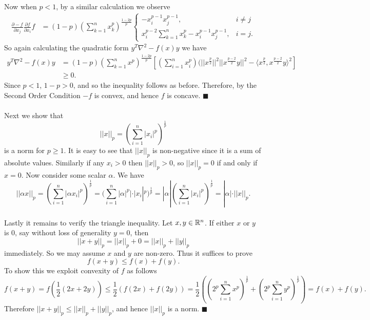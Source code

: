 \documentclass[letterpaper,12pt,oneside,onecolumn]{article}
\begin{document}
\paragraph{}
Now when $p < 1$, by a similar calculation we observe
\begin{align*}
\frac{\partial -f}{\partial x_j}\frac{\partial f}{\partial x_i} f &=(1-p)(\sum_{k=1}^n x_k^p)^\frac{1-2p}{p}\begin{cases}
-x_i^{p-1}x_j^{p-1}, &i\neq j \\
x_i^{p-2}\sum_{k=1}^n x_k^p  -x_i^{p-1}x_j^{p-1}, &i=j.
\end{cases}
\end{align*}
So again calculating the quadratic form $y^T\nabla^2-f(x)y$ we have
\begin{align*}
y^T\nabla^2-f(x)y &=(1-p) (\sum_{k=1}^nx^p)^\frac{1-2p}{p}[(\sum_{i=1}^nx_i^{p})(||x^\frac{p}{2}||^2||x^\frac{p-2}{2}y||^2 - \langle x^\frac{p}{2}, x^\frac{p-2}{2}y\rangle^2]\\
&\geq 0.
\end{align*}
Since $p < 1$, $1-p >0$, and so the inequality follows as before. Therefore, by the Second Order Condition $-f$ is convex, and hence $f$ is concave. $\blacksquare$
\paragraph{}
Next we show that
$$||x||_p = (\sum_{i=1}^n |x_i|^p)^\frac{1}{p}$$
is a norm for $p\geq 1$. It is easy to see that $||x||_p$ is non-negative since it is a sum of absolute values. Similarly if any $x_i > 0$ then $||x||_p > 0$, so $||x||_p = 0$ if and only if $x = 0$. Now consider some scalar $\alpha$. We have
$$||\alpha x||_p = (\sum_{i=1}^n |\alpha x_i|^p)^\frac{1}{p} = (\sum_{i=1}^n |\alpha|^p|\cdot |x_i|^p)^\frac{1}{p} = |\alpha|(\sum_{i=1}^n |x_i|^p)^\frac{1}{p} = |\alpha|\cdot ||x||_p.$$
\paragraph{}
Lastly it remains to verify the triangle inequality. Let $x, y \in \mathbb{R}^n$. If either $x$ or $y$ is $0$, say without loss of generality $y=0$, then 
$$||x + y||_p = ||x||_p + 0 = ||x||_p + ||y||_p$$
immediately. So we may assume $x$ and $y$ are non-zero. Thus it suffices to prove
$$f(x+y) \leq f(x) + f(y).$$
To show this we exploit convexity of $f$ as follows
$$f(x+y) = f(\frac{1}{2}(2x+2y)) \leq \frac{1}{2}(f(2x) + f(2y)) = \frac{1}{2} ((2^p\sum_{i=1}^n x^p)^\frac{1}{p} +(2^p\sum_{i=1}^n y^p)^\frac{1}{p}) = f(x) + f(y).$$
Therefore $||x + y||_p \leq ||x||_p + ||y||_p$, and hence $||x||_p$ is a norm. $\blacksquare$
\end{document}
